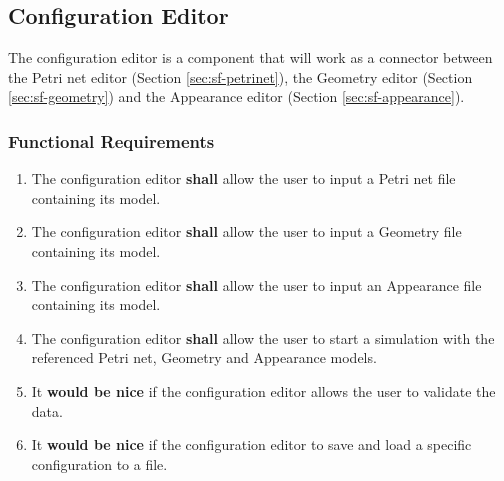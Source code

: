 \subsection{Configuration Editor}

The configuration editor is a component that will work as a connector between the Petri net editor (Section \ref{sec:sf-petrinet}), the Geometry editor (Section \ref{sec:sf-geometry}) and the Appearance editor (Section \ref{sec:sf-appearance}). 

\subsubsection{Functional Requirements}

\begin{enumerate}
	\item The configuration editor \textbf{shall} allow the user to input a Petri net file containing its model.
	\item The configuration editor \textbf{shall} allow the user to input a Geometry file containing its model.
	\item The configuration editor \textbf{shall} allow the user to input an Appearance file containing its model.
	\item The configuration editor \textbf{shall} allow the user to start a simulation with the referenced Petri net, Geometry and Appearance models.
	\item It \textbf{would be nice} if the configuration editor allows the user to validate the data.
	\item It \textbf{would be nice} if the configuration editor to save and load a specific configuration to a file.
\end{enumerate}
